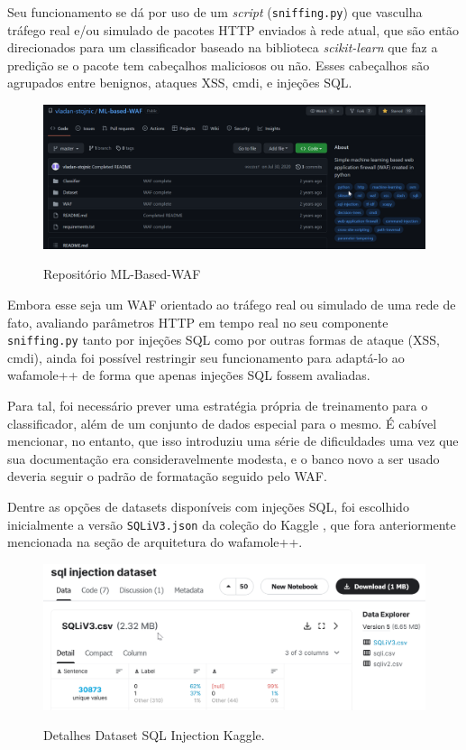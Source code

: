 Seu funcionamento se dá por uso de um \textit{script} (\verb+sniffing.py+) que vasculha tráfego real e/ou simulado de pacotes HTTP enviados à rede atual, que são então direcionados para um classificador baseado na biblioteca \textit{scikit-learn} que faz a predição se o pacote tem cabeçalhos maliciosos ou não. Esses cabeçalhos são agrupados entre benignos, ataques XSS, cmdi, e injeções SQL.

\begin{figure}[ht]
    \centering
    \caption{Repositório ML-Based-WAF}
    \includegraphics[width=16cm]{figuras/MLBasedWAF.png} 
    \label{fig:internet} 
\end{figure}

Embora esse seja um WAF orientado ao tráfego real ou simulado de uma rede de fato, avaliando parâmetros HTTP em tempo real no seu componente \verb+sniffing.py+ tanto por injeções SQL como por outras formas de ataque (XSS, cmdi), ainda foi possível restringir seu funcionamento para adaptá-lo ao wafamole++ de forma que apenas injeções SQL fossem avaliadas.

Para tal, foi necessário prever uma estratégia própria de treinamento para o classificador, além de um conjunto de dados especial para o mesmo. É cabível mencionar, no entanto, que isso introduziu uma série de dificuldades uma vez que sua documentação era consideravelmente modesta, e o banco novo a ser usado deveria seguir o padrão de formatação seguido pelo WAF.

Dentre as opções de datasets disponíveis com injeções SQL, foi escolhido inicialmente a versão \verb+SQLiV3.json+ da coleção do Kaggle \cite{kaggle_dataset_sql}, que fora anteriormente mencionada na seção de arquitetura do wafamole++.

\begin{figure}[ht]
    \centering
    \caption{Detalhes Dataset SQL Injection Kaggle.}
    \includegraphics[width=16cm]{figuras/sqlInjectionDataset.png} 
    \label{fig:internet} 
\end{figure}

